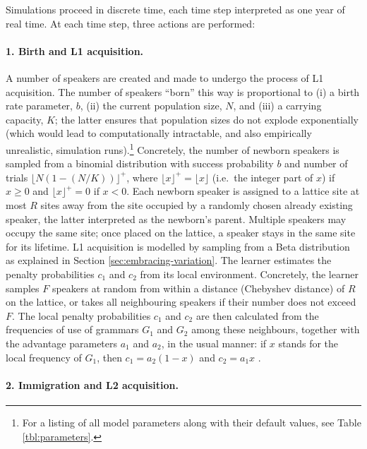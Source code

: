 Simulations proceed in discrete time, each time step interpreted as one
year of real time. At each time step, three actions are performed:

\paragraph*{1. Birth and L1 acquisition.}

A number of speakers are created and made to undergo the process of L1
acquisition. The number of speakers ``born'' this way is proportional to
(i) a birth rate parameter, \(b\), (ii) the current population size,
\(N\), and (iii) a carrying capacity, \(K\); the latter ensures that
population sizes do not explode exponentially (which would lead to
computationally intractable, and also empirically unrealistic,
simulation runs).\footnote{For a listing of all model parameters along
  with their default values, see Table \ref{tbl:parameters}.}
Concretely, the number of newborn speakers is sampled from a binomial
distribution with success probability \(b\) and number of trials
\(\lfloor N(1 - (N/K)) \rfloor^+\), where
\(\lfloor x \rfloor^+ = \lfloor x \rfloor\) (i.e.~the integer part of
\(x\)) if \(x \geq 0\) and \(\lfloor x \rfloor^+ = 0\) if \(x < 0\).
Each newborn speaker is assigned to a lattice site at most \(R\) sites
away from the site occupied by a randomly chosen already existing
speaker, the latter interpreted as the newborn's parent. Multiple
speakers may occupy the same site; once placed on the lattice, a speaker
stays in the same site for its lifetime. L1 acquisition is modelled by
sampling from a Beta distribution as explained in Section
\ref{sec:embracing-variation}. The learner estimates the penalty
probabilities \(c_1\) and \(c_2\) from its local environment.
Concretely, the learner samples \(F\) speakers at random from within a
distance (Chebyshev distance) of \(R\) on the lattice, or takes all
neighbouring speakers if their number does not exceed \(F\). The local
penalty probabilities \(c_1\) and \(c_2\) are then calculated from the
frequencies of use of grammars \(G_1\) and \(G_2\) among these
neighbours, together with the advantage parameters \(a_1\) and \(a_2\),
in the usual manner: if \(x\) stands for the local frequency of \(G_1\),
then \(c_1 = a_2(1-x)\) and \(c_2 = a_1x\)
\autocite{Yang2000,WallenbergEtAlDiaCom}.

\paragraph*{2. Immigration and L2 acquisition.}

